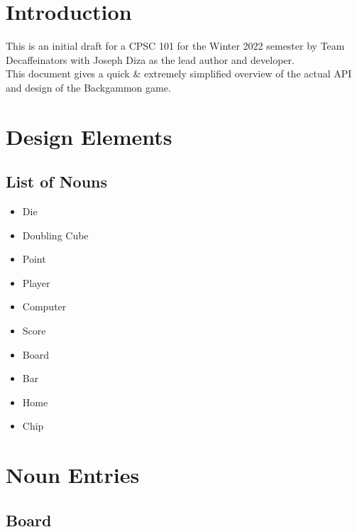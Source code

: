 \documentclass{report}
\begin{document}
    
    \tableofcontents

    \chapter{Introduction}

    This is an initial draft for a CPSC 101 for the Winter 2022 semester by Team Decaffeinators
    with Joseph Diza as the lead author and developer.  \\

    \noindent
    This document gives a quick \& extremely simplified overview
    of the actual API and design of the Backgammon game.

    \chapter{Design Elements}

    \section{List of Nouns}

    \begin{multicols}{2}
        \begin{itemize}
            \item Die
            \item Doubling Cube
            \item Point
            \item Player
            \item Computer
        \end{itemize}

        \begin{itemize}
            \item Score
            \item Board
            \item Bar
            \item Home
            \item Chip
        \end{itemize}
    \end{multicols}





    \chapter{Noun Entries}

    \section{Board}
\end{document}
